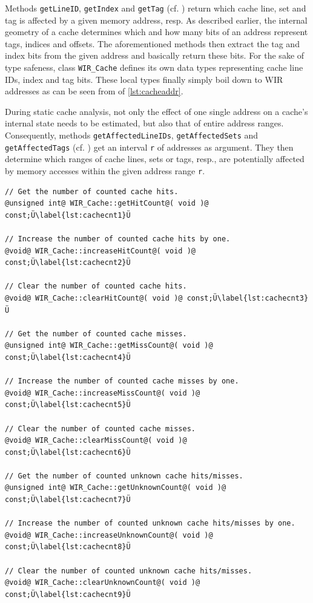 Methods \texttt{getLineID}, \texttt{getIndex} and \texttt{getTag} (cf. ) return which cache line, set and tag is affected by a given memory address, resp.
As described earlier, the internal geometry of a cache determines which and how many bits of an address represent tags, indices and offsets.
The aforementioned methods then extract the tag and index bits from the given address and basically return these bits.
For the sake of type safeness, class \texttt{WIR\_Cache} defines its own data types representing cache line IDs, index and tag bits.
These local types finally simply boil down to \gls{WIR} addresses as can be seen from  of \cref{lst:cacheaddr}.

During static cache analysis, not only the effect of one single address on a cache's internal state needs to be estimated, but also that of entire address ranges.
Consequently, methods \texttt{getAffectedLineIDs}, \texttt{getAffected\-Sets} and \texttt{getAffectedTags} (cf. ) get an interval \texttt{r} of addresses as argument.
They then determine which ranges of cache lines, sets or tags, resp., are potentially affected by memory accesses within the given address range \texttt{r}.

\begin{lstlisting}[style=code,float=t,caption={Event Counting of Class \texttt{WIR\_Cache}},label=lst:cachecnt]
// Get the number of counted cache hits.
@unsigned int@ WIR_Cache::getHitCount@( void )@ const;Ü\label{lst:cachecnt1}Ü

// Increase the number of counted cache hits by one.
@void@ WIR_Cache::increaseHitCount@( void )@ const;Ü\label{lst:cachecnt2}Ü

// Clear the number of counted cache hits.
@void@ WIR_Cache::clearHitCount@( void )@ const;Ü\label{lst:cachecnt3}Ü

// Get the number of counted cache misses.
@unsigned int@ WIR_Cache::getMissCount@( void )@ const;Ü\label{lst:cachecnt4}Ü

// Increase the number of counted cache misses by one.
@void@ WIR_Cache::increaseMissCount@( void )@ const;Ü\label{lst:cachecnt5}Ü

// Clear the number of counted cache misses.
@void@ WIR_Cache::clearMissCount@( void )@ const;Ü\label{lst:cachecnt6}Ü

// Get the number of counted unknown cache hits/misses.
@unsigned int@ WIR_Cache::getUnknownCount@( void )@ const;Ü\label{lst:cachecnt7}Ü

// Increase the number of counted unknown cache hits/misses by one.
@void@ WIR_Cache::increaseUnknownCount@( void )@ const;Ü\label{lst:cachecnt8}Ü

// Clear the number of counted unknown cache hits/misses.
@void@ WIR_Cache::clearUnknownCount@( void )@ const;Ü\label{lst:cachecnt9}Ü
\end{lstlisting}

